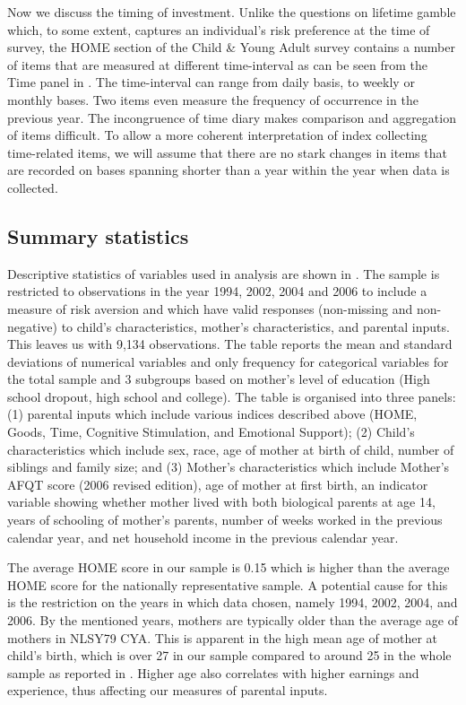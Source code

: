 \documentclass[]{article}
\begin{document}
Now we discuss the timing of investment. Unlike the questions on lifetime gamble which, to some extent, captures an individual's risk preference at the time of survey, the HOME section of the Child \& Young Adult survey contains a number of items that are measured at different time-interval as can be seen from the Time panel in . The time-interval can range from daily basis, to weekly or monthly bases. Two items even measure the frequency of occurrence in the previous year. The incongruence of time diary makes comparison and aggregation of items difficult. To allow a more coherent interpretation of index collecting time-related items, we will assume that there are no stark changes in items that are recorded on bases spanning shorter than a year within the year when data is collected.


\subsection{Summary statistics}


Descriptive statistics of variables used in analysis are shown in . The sample is restricted to observations in the year 1994, 2002, 2004 and 2006 to include a measure of risk aversion and which have valid responses (non-missing and non-negative) to child's characteristics, mother's characteristics, and parental inputs. This leaves us with 9,134 observations. The table reports the mean and standard deviations of numerical variables and only frequency for categorical variables for the total sample and 3 subgroups based on mother's level of education (High school dropout, high school and college). The table is organised into three panels: (1) parental inputs which include various indices described above (HOME, Goods, Time, Cognitive Stimulation, and Emotional Support); (2) Child's characteristics which include sex, race, age of mother at birth of child, number of siblings and family size; and (3) Mother's characteristics which include Mother's AFQT score (2006 revised edition), age of mother at first birth, an indicator variable showing whether mother lived with both biological parents at age 14, years of schooling of mother's parents, number of weeks worked in the previous calendar year, and net household income in the previous calendar year.


The average HOME score in our sample is 0.15 which is higher than the average HOME score for the nationally representative sample. A potential cause for this is the restriction on the years in which data chosen, namely 1994, 2002, 2004, and 2006. By the mentioned years, mothers are typically older than the average age of mothers in NLSY79 CYA. This is apparent in the high mean age of mother at child's birth, which is over 27 in our sample compared to around 25 in the whole sample as reported in \citet{carneiro2016partial}. Higher age also correlates with higher earnings and experience, thus affecting our measures of parental inputs. 
\end{document}
